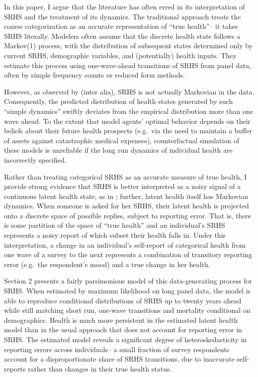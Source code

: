 \documentclass[12pt,pdftex,letterpaper]{article}
\begin{document}
In this paper, I argue that the literature has often erred in its interpretation of SRHS and the treatment of its dynamics.  The traditional approach treats the coarse categorization as an accurate representation of ``true health''-- it takes SRHS literally.  Modelers often assume that the discrete health state follows a Markov(1) process, with the distribution of subsequent states determined only by current SRHS, demographic variables, and (potentially) health inputs. They estimate this process using one-wave-ahead transitions of SRHS from panel data, often by simple frequency counts or reduced form methods.

However, as observed by \cite{DeNardi18} (inter alia), SRHS is not actually Markovian in the data. Consequently, the predicted distribution of health states generated by such ``simple dynamics'' swiftly deviates from the empirical distribution more than one wave ahead.  To the extent that model agents' optimal behavior depends on their beliefs about their future health prospects (e.g.\ via the need to maintain a buffer of assets against catastrophic medical expenses), counterfactual simulation of these models is unreliable if the long run dynamics of individual health are incorrectly specified.

Rather than treating categorical SRHS as an accurate measure of true health, I provide strong evidence that SRHS is better interpreted as a noisy signal of a continuous latent health state, as in \cite{BoundStinebrickner10}; further, latent health itself has Markovian dynamics. When someone is asked for her SRHS, their latent health is projected onto a discrete space of possible replies, subject to reporting error.  That is, there is some partition of the space of ``true health'' and an individual's SRHS represents a noisy report of which subset their health falls in. Under this interpretation, a change in an individual's self-report of categorical health from one wave of a survey to the next represents a combination of transitory reporting error (e.g.\ the respondent's mood) and a true change in her health.

Section 2 presents a fairly parsimonious model of this data-generating process for SRHS. When estimated by maximum likelihood on long panel data, the model is able to reproduce conditional distributions of SRHS up to twenty years ahead while still matching short run, one-wave transitions and mortality conditional on demographics.  Health is much more persistent in the estimated latent health model than in the usual approach that does not account for reporting error in SRHS. The estimated model reveals a significant degree of heteroskedasticity in reporting errors across individuals-- a small fraction of survey respondents account for a disproportionate share of SRHS transitions, due to inaccurate self-reports rather than changes in their true health status.
\end{document}
